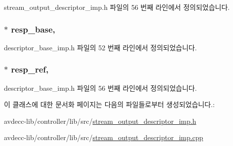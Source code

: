 stream\+\_\+output\+\_\+descriptor\+\_\+imp.\+h 파일의 56 번째 라인에서 정의되었습니다.

\subsubsection[{\texorpdfstring{resp\+\_\+base}{resp_base}}]{$\ast$ resp\+\_\+base\hspace{0.3cm}{\ttfamily [protected]}, {\ttfamily [inherited]}}\hypertarget{classavdecc__lib_1_1descriptor__base__imp_a8b104da8319cda946944548ebb9552f4}{}\label{classavdecc__lib_1_1descriptor__base__imp_a8b104da8319cda946944548ebb9552f4}


descriptor\+\_\+base\+\_\+imp.\+h 파일의 52 번째 라인에서 정의되었습니다.

\subsubsection[{\texorpdfstring{resp\+\_\+ref}{resp_ref}}]{$\ast$ resp\+\_\+ref\hspace{0.3cm}{\ttfamily [protected]}, {\ttfamily [inherited]}}\hypertarget{classavdecc__lib_1_1descriptor__base__imp_a2642e3a7c10d38553e7ff4a55e875346}{}\label{classavdecc__lib_1_1descriptor__base__imp_a2642e3a7c10d38553e7ff4a55e875346}


descriptor\+\_\+base\+\_\+imp.\+h 파일의 56 번째 라인에서 정의되었습니다.



이 클래스에 대한 문서화 페이지는 다음의 파일들로부터 생성되었습니다.\+:\begin{DoxyCompactItemize}
\item 
avdecc-\/lib/controller/lib/src/\hyperlink{stream__output__descriptor__imp_8h}{stream\+\_\+output\+\_\+descriptor\+\_\+imp.\+h}\item 
avdecc-\/lib/controller/lib/src/\hyperlink{stream__output__descriptor__imp_8cpp}{stream\+\_\+output\+\_\+descriptor\+\_\+imp.\+cpp}\end{DoxyCompactItemize}
